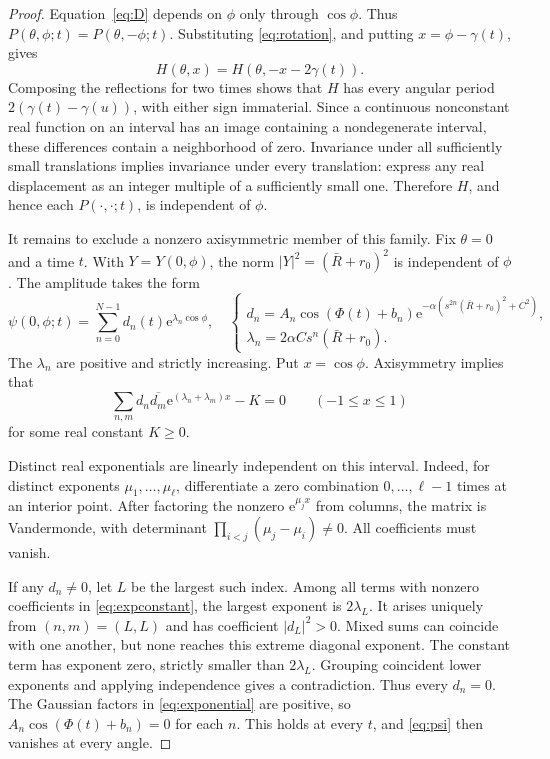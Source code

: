 \documentclass[11pt,a4paper]{article}
\theoremstyle{definition}
\theoremstyle{remark}
\newcommand{\e}{\mathrm e}
\begin{document}
\begin{proof}
Equation~\eqref{eq:D} depends on $\phi$ only through
$\cos\phi$. Thus $P(\theta,\phi;t)=P(\theta,-\phi;t)$.
Substituting \eqref{eq:rotation}, and putting
$x=\phi-\gamma(t)$, gives
\[
 H(\theta,x)=H(\theta,-x-2\gamma(t)).
\]
Composing the reflections for two times shows that $H$ has
every angular period $2(\gamma(t)-\gamma(u))$, with either
sign immaterial. Since a continuous nonconstant real function
on an interval has an image containing a nondegenerate interval,
these differences contain a neighborhood of zero. Invariance
under all sufficiently small translations implies invariance
under every translation: express any real displacement as an
integer multiple of a sufficiently small one. Therefore $H$,
and hence each $P(\cdot,\cdot;t)$, is independent of $\phi$.

It remains to exclude a nonzero axisymmetric member of this
family. Fix $\theta=0$ and a time $t$. With $Y=Y(0,\phi)$,
the norm $|Y|^2=(\bar R+r_0)^2$ is independent of $\phi$.
The amplitude takes the form
\begin{equation}
 \psi(0,\phi;t)=\sum_{n=0}^{N-1} d_n(t)\e^{\lambda_n\cos\phi},
 \quad
 \begin{cases}
 d_n=A_n\cos(\Phi(t)+b_n)
       \e^{-\alpha(s^{2n}(\bar R+r_0)^2+C^2)},\\
 \lambda_n=2\alpha C s^n(\bar R+r_0).
 \end{cases}
 \label{eq:exponential}
\end{equation}
The $\lambda_n$ are positive and strictly increasing. Put
$x=\cos\phi$. Axisymmetry implies that
\begin{equation}
 \sum_{n,m}d_n\overline{d_m}\e^{(\lambda_n+\lambda_m)x}
       -K=0\qquad(-1\leq x\leq1)
 \label{eq:expconstant}
\end{equation}
for some real constant $K\geq0$.

Distinct real exponentials are linearly independent on this
interval. Indeed, for distinct exponents $\mu_1,\ldots,\mu_\ell$,
differentiate a zero combination $0,\ldots,\ell-1$ times at an
interior point. After factoring the nonzero
$\e^{\mu_jx}$ from columns, the matrix is Vandermonde, with
determinant $\prod_{i<j}(\mu_j-\mu_i)\neq0$. All coefficients
must vanish.

If any $d_n\neq0$, let $L$ be the largest such index. Among
all terms with nonzero coefficients in \eqref{eq:expconstant},
the largest exponent is $2\lambda_L$. It arises uniquely from
$(n,m)=(L,L)$ and has coefficient $|d_L|^2>0$.
Mixed sums can coincide with one another, but none reaches this
extreme diagonal exponent. The constant term has exponent zero,
strictly smaller than $2\lambda_L$. Grouping coincident lower
exponents and applying independence gives a contradiction.
Thus every $d_n=0$. The Gaussian factors in
\eqref{eq:exponential} are positive, so
$A_n\cos(\Phi(t)+b_n)=0$ for each $n$. This holds at every
$t$, and \eqref{eq:psi} then vanishes at every angle.
\end{proof}
\end{document}
